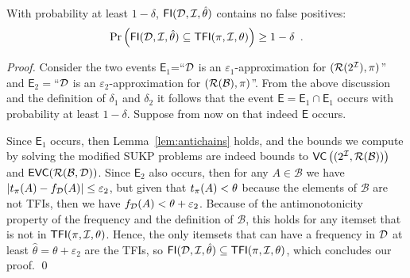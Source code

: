 \begin{theorem}\label{lem:vcfull}
With probability at least $1-\delta$, %
$\mathsf{FI}({\cal D},{\cal I},\hat\theta)$ contains no false positives:
\[
\Pr\left(\mathsf{FI}({\cal D},{\cal I},\hat\theta)\subseteq\mathsf{TFI}(\pi,{\cal I},\theta)\right)\ge 1-\delta\enspace.\]
\end{theorem}
\ifarxiv
\begin{proof}
  Consider the two events $\mathsf{E}_1$=``${\cal D}$ is an
  $\varepsilon_1$-approximation for $(\mathcal{R}(2^{\cal I}),\pi)$'' and
  $\mathsf{E}_2=$``${\cal D}$ is an
  $\varepsilon_2$-approximation for $(\mathcal{R}(\mathcal{B}),\pi)$''. From
  the above discussion and the definition of $\delta_1$ and $\delta_2$ it
  follows that the event $\mathsf{E}=\mathsf{E}_1\cap\mathsf{E}_1$ occurs with
  probability at least $1-\delta$. Suppose from now on that indeed $\mathsf{E}$
  occurs.

  Since $\mathsf{E}_1$ occurs, then Lemma~\ref{lem:antichains}
  holds, and the bounds we compute by solving the modified SUKP problems are
  indeed bounds to $\mathsf{VC}\left((2^{\cal I},\mathcal{R}(\mathcal{B}))\right)$ and
  $\mathsf{EVC}(\mathcal{R}(\mathcal{B},{\cal D}))$. %
  Since $\mathsf{E}_2$ also occurs, then for any $A\in\mathcal{B}$ we
  have $|t_\pi(A)-f_{\cal D}(A)|\le\varepsilon_2$, but given that $t_\pi(A)<\theta$
  because the elements of $\mathcal{B}$ are not TFIs, then we have
  $f_{\cal D}(A)<\theta+\varepsilon_2$. Because of the antimonotonicity property
  of the frequency and the definition of $\mathcal{B}$, this holds for any
  itemset that is not in $\mathsf{TFI}(\pi,{\cal I},\theta)$. Hence, the only itemsets that can have a
  frequency in ${\cal D}$ at least $\hat{\theta}=\theta+\varepsilon_2$ are the TFIs, so
  $\mathsf{FI}({\cal D},{\cal I},\hat{\theta})\subseteq\mathsf{TFI}(\pi,{\cal I},\theta)$, which concludes
  our proof.
  \qed
\end{proof}

